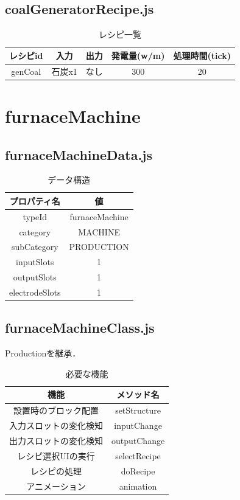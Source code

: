 \documentclass[uplatex,dvipdfmx,report]{jlreq}
\begin{document}
\subsection{coalGeneratorRecipe.js}

\begin{table}[H]
    \centering
    \caption{レシピ一覧}
    \begin{tabular}{ccccc}
        \hline
        レシピid & 入力 & 出力 & 発電量(w/m) & 処理時間(tick) \\
        \hline
        \hline
        genCoal & 石炭x1 & なし & 300 & 20 \\
        \hline
    \end{tabular}
\end{table}

\section{furnaceMachine}

\subsection{furnaceMachineData.js}

\begin{table}[H]
    \centering
    \caption{データ構造}
    \begin{tabular}{cc}
        \hline
        プロパティ名 & 値 \\
        \hline
        \hline
        typeId & furnaceMachine \\
        category & MACHINE \\
        subCategory & PRODUCTION \\
        inputSlots & 1 \\
        outputSlots & 1 \\
        electrodeSlots & 1 \\
        \hline
    \end{tabular}
\end{table}

\subsection{furnaceMachineClass.js}

Productionを継承．

\begin{table}[H]
    \centering
    \caption{必要な機能}
    \begin{tabular}{cc}
        \hline
        機能 & メソッド名 \\
        \hline
        \hline
        設置時のブロック配置 & setStructure \\
        入力スロットの変化検知 & inputChange \\
        出力スロットの変化検知 & outputChange \\
        レシピ選択UIの実行 & selectRecipe \\
        レシピの処理 & doRecipe \\
        アニメーション & animation \\
        \hline
    \end{tabular}
\end{table}
\end{document}
